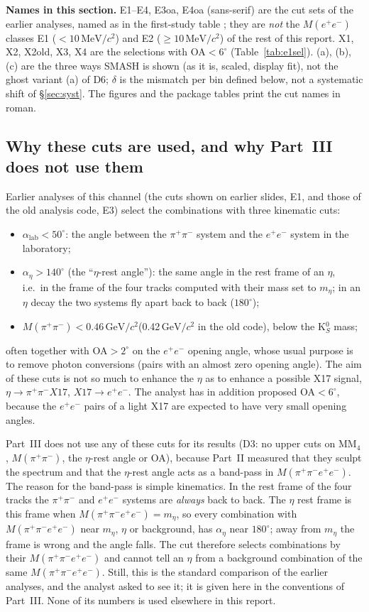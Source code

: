 \documentclass[11pt,a4paper]{article}
\newcommand{\ee}{\ensuremath{e^{+}e^{-}}\xspace}
\newcommand{\pipi}{\ensuremath{\pi^{+}\pi^{-}}\xspace}
\newcommand{\Mfour}{\ensuremath{M(\pi^{+}\pi^{-}e^{+}e^{-})}\xspace}
\newcommand{\Mee}{\ensuremath{M(e^{+}e^{-})}\xspace}
\newcommand{\Mpipi}{\ensuremath{M(\pi^{+}\pi^{-})}\xspace}
\newcommand{\GeVcc}{\ensuremath{\mathrm{GeV}/c^{2}}\xspace}
\newcommand{\MeVcc}{\ensuremath{\mathrm{MeV}/c^{2}}\xspace}
\newcommand{\code}[1]{\texttt{\detokenize{#1}}}
\newcommand{\MMfour}{\ensuremath{\mathrm{MM}_4}\xspace}
\newcommand{\notebox}[1]{\par\noindent\colorbox{orange!10}{\parbox{\dimexpr\linewidth-2\fboxsep\relax}{#1}}\par}
\newcommand{\cs}[1]{\textsf{#1}}%
\begin{document}
\notebox{\textbf{Names in this section.} \cs{E1}--\cs{E4}, \cs{E3oa}, \cs{E4oa} (sans-serif) are the cut sets of the earlier analyses, named as in
the first-study table \code{rw_compare_enriched.txt}; they are \emph{not} the \Mee classes E1 ($<10$\,\MeVcc) and E2 ($\ge10$\,\MeVcc) of the
rest of this report. \cs{X1}, \cs{X2}, \cs{X2old}, \cs{X3}, \cs{X4} are the selections with OA$<6^\circ$ (Table~\ref{tab:e1sel}). (a), (b), (c)
are the three ways SMASH is shown (as it is, scaled, display fit), not the ghost variant (a) of D6; $\delta$ is the mismatch per bin defined
below, not a systematic shift of \S\ref{sec:syst}. The figures and the package tables print the cut names in roman.}

\subsection{Why these cuts are used, and why Part~III does not use them}
\label{sec:e1why}
Earlier analyses of this channel (the cuts shown on earlier slides, \cs{E1}, and those of the old analysis code, \cs{E3}) select the combinations with
three kinematic cuts:
\begin{itemize}\setlength{\itemsep}{0pt}
\item $\alpha_{\mathrm{lab}}<50^\circ$: the angle between the \pipi system and the \ee system in the laboratory;
\item $\alpha_\eta>140^\circ$ (the ``$\eta$-rest angle''): the same angle in the rest frame of an $\eta$, i.e.\ in the frame of the four tracks
      computed with their mass set to $m_\eta$; in an $\eta$ decay the two systems fly apart back to back ($180^\circ$);
\item \Mpipi$<0.46$\,\GeVcc (0.42\,\GeVcc in the old code), below the K$^0_S$ mass;
\end{itemize}
often together with OA$>2^\circ$ on the \ee opening angle, whose usual purpose is to remove photon conversions (pairs with an almost zero
opening angle). The aim of these cuts is not so much to enhance the $\eta$ as to enhance a possible X17 signal, $\eta\to\pipi X17$,
$X17\to\ee$. The analyst has in addition proposed OA$<6^\circ$, because the \ee pairs of a light X17 are expected to have very small opening
angles.

Part~III does not use any of these cuts for its results (D3: no upper cuts on \MMfour, \Mpipi, the $\eta$-rest angle or OA), because Part~II
measured that they sculpt the spectrum and that the $\eta$-rest angle acts as a band-pass in \Mfour. The reason for the band-pass is simple
kinematics. In the rest frame of the four tracks the \pipi and \ee systems are \emph{always} back to back. The $\eta$ rest frame is this frame
when \Mfour$=m_\eta$, so every combination with \Mfour near $m_\eta$, $\eta$ or background, has $\alpha_\eta$ near $180^\circ$; away from $m_\eta$ the
frame is wrong and the angle falls. The cut therefore selects combinations by their \Mfour and cannot tell an $\eta$ from a background combination of the same
\Mfour. Still, this is the standard comparison of the earlier analyses, and the analyst asked to see it; it is given here in the conventions of
Part~III. None of its numbers is used elsewhere in this report.
\end{document}
